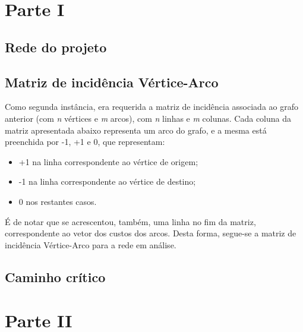 \documentclass[a4paper]{article}
\begin{document}

\pagebreak
\section{Parte I}
\label{sec:2}

\hspace{3mm} 

\subsection{Rede do projeto}
\hspace{3mm} 

\pagebreak

\subsection{Matriz de incidência Vértice-Arco}
\hspace{3mm} Como segunda instância, era requerida a matriz de incidência associada ao grafo anterior (com \emph{n} vértices e \emph{m} arcos), com \emph{n} linhas e \emph{m} colunas. Cada coluna da matriz apresentada abaixo representa um arco do grafo, e a mesma está preenchida por -1, +1 e 0, que representam:


\begin{itemize}
    \item +1 na linha correspondente ao vértice de origem;
    \item -1 na linha correspondente ao vértice de destino;
    \item 0 nos restantes casos.
\end{itemize}


\par É de notar que se acrescentou, também, uma linha no fim da matriz, correspondente ao vetor dos custos dos arcos. Desta forma, segue-se a matriz de incidência Vértice-Arco para a rede em análise.




\subsection{Caminho crítico}
\hspace{3mm} 



\pagebreak
\clearpage
\section{Parte II}
\label{sec:3}
\end{document}

